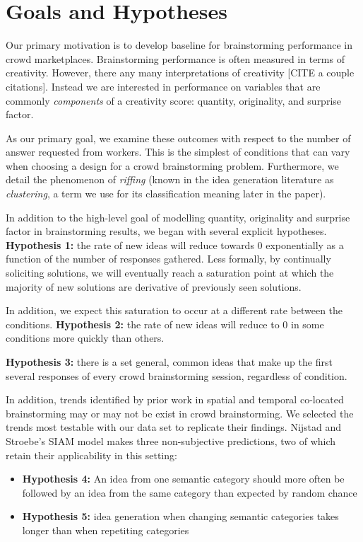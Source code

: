 \section{Goals and Hypotheses}

Our primary motivation is to develop baseline for brainstorming performance in crowd marketplaces. Brainstorming performance is often measured in terms of creativity. However, there any many interpretations of creativity [CITE a couple citations]. Instead we are interested in performance on variables that are commonly \emph{components} of a creativity score: quantity, originality, and surprise factor.

As our primary goal, we examine these outcomes with respect to the number of answer requested from workers. This is the simplest of conditions that can vary when choosing a design for a crowd brainstorming problem. Furthermore, we detail the phenomenon of \emph{riffing} (known in the idea generation literature as \emph{clustering}, a term we use for its classification meaning later in the paper).

In addition to the high-level goal of modelling quantity, originality and surprise factor in brainstorming results, we began with several explicit hypotheses. \textbf{Hypothesis 1:} the rate of new ideas will reduce towards 0 exponentially as a function of the number of responses gathered. Less formally, by continually soliciting solutions, we will eventually reach a saturation point at which the majority of new solutions are derivative of previously seen solutions.

In addition, we expect this saturation to occur at a different rate between the conditions. \textbf{Hypothesis 2:} the rate of new ideas will reduce to 0 in some conditions more quickly than others.

\textbf{Hypothesis 3:} there is a set general, common ideas that make up the first several responses of every crowd brainstorming session, regardless of condition. 

In addition, trends identified by prior work in spatial and temporal co-located brainstorming may or may not be exist in crowd brainstorming. We selected the trends most testable with our data set to replicate their findings. Nijstad and Stroebe's SIAM model \cite{nijstad_how_2006} makes three non-subjective predictions, two of which retain their applicability in this setting:

\begin{itemize}
\item \textbf{Hypothesis 4:} An idea from one semantic category should more often be followed by an idea from the same category than expected by random chance
\item \textbf{Hypothesis 5:} idea generation when changing semantic categories takes longer than when repetiting categories
\end{itemize}

